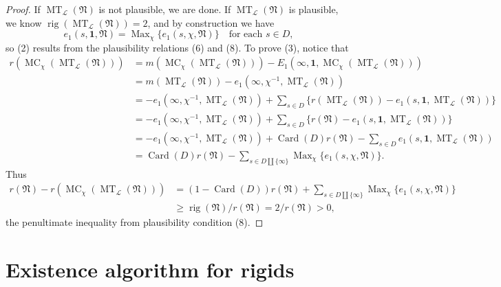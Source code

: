 \begin{proof}
If \(\operatorname{MT}_{\mathcal{L}}(\mathfrak{N})\) is not plausible, we are done. If \(\operatorname{MT}_{\mathcal{L}}(\mathfrak{N})\) is plausible, we know \(\operatorname{rig}(\operatorname{MT}_{\mathcal{L}}(\mathfrak{N}))=2\), and by construction we have
\[
e_1(s,\mathbf{1},\mathfrak{N})=\operatorname{Max}_\chi\{e_1(s,\chi,\mathfrak{N})\}\quad\text{for each }s\in D,
\]
so (2) results from the plausibility relations (6) and (8). To prove (3), notice that
\[
\begin{aligned}
r(\operatorname{MC}_\chi(\operatorname{MT}_{\mathcal{L}}(\mathfrak{N})))
&=m(\operatorname{MC}_\chi(\operatorname{MT}_{\mathcal{L}}(\mathfrak{N})))
-E_1(\infty,\mathbf{1},\operatorname{MC}_\chi(\operatorname{MT}_{\mathcal{L}}(\mathfrak{N})))\\
&=m(\operatorname{MT}_{\mathcal{L}}(\mathfrak{N}))
-e_1(\infty,\chi^{-1},\operatorname{MT}_{\mathcal{L}}(\mathfrak{N}))\\
&=-e_1(\infty,\chi^{-1},\operatorname{MT}_{\mathcal{L}}(\mathfrak{N}))
 +\sum_{s\in D}\{r(\operatorname{MT}_{\mathcal{L}}(\mathfrak{N}))-e_1(s,\mathbf{1},\operatorname{MT}_{\mathcal{L}}(\mathfrak{N}))\}\\
&=-e_1(\infty,\chi^{-1},\operatorname{MT}_{\mathcal{L}}(\mathfrak{N}))
 +\sum_{s\in D}\{r(\mathfrak{N})-e_1(s,\mathbf{1},\operatorname{MT}_{\mathcal{L}}(\mathfrak{N}))\}\\
&=-e_1(\infty,\chi^{-1},\operatorname{MT}_{\mathcal{L}}(\mathfrak{N}))
 +\operatorname{Card}(D)r(\mathfrak{N})-\sum_{s\in D}e_1(s,\mathbf{1},\operatorname{MT}_{\mathcal{L}}(\mathfrak{N}))\\
&=\operatorname{Card}(D)r(\mathfrak{N})-\sum_{s\in D\amalg\{\infty\}}\operatorname{Max}_\chi\{e_1(s,\chi,\mathfrak{N})\}.
\end{aligned}
\]
Thus
\[
\begin{aligned}
r(\mathfrak{N})-r(\operatorname{MC}_\chi(\operatorname{MT}_{\mathcal{L}}(\mathfrak{N})))
&=(1-\operatorname{Card}(D))r(\mathfrak{N})
 +\sum_{s\in D\amalg\{\infty\}}\operatorname{Max}_\chi\{e_1(s,\chi,\mathfrak{N})\}\\
&\geq \operatorname{rig}(\mathfrak{N})/r(\mathfrak{N})=2/r(\mathfrak{N})>0,
\end{aligned}
\]
the penultimate inequality from plausibility condition (8).
\end{proof}

\section{Existence algorithm for rigids}
\label{sec:6.4}

